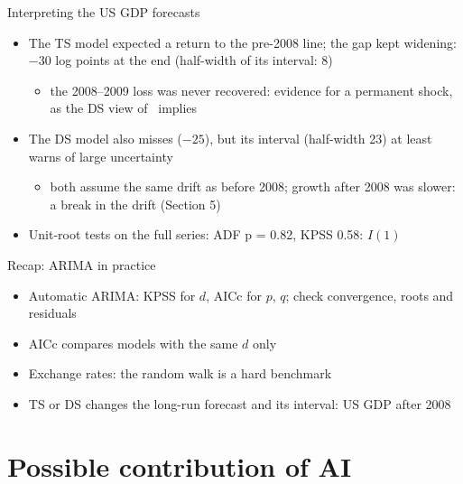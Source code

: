 \begin{frame}{Interpreting the US GDP forecasts}
\itemsize{\small}
\begin{itemize}
    \item The TS model expected a return to the pre-2008 line; the gap kept widening: $\ensuremath{-}30$ log points at the end (half-width of its interval: 8)
    \begin{itemize}
        \item the 2008--2009 loss was never recovered: evidence for a permanent shock, as the DS view of \ implies
    \end{itemize}
    \item The DS model also misses ($\ensuremath{-}25$), but its interval (half-width 23) at least warns of large uncertainty
    \begin{itemize}
        \item both assume the same drift as before 2008; growth after 2008 was slower: a break in the drift (Section 5)
    \end{itemize}
    \item Unit-root tests on the full series: ADF p = 0.82, KPSS 0.58: $I(1)$
\end{itemize}
\end{frame}

\begin{frame}{Recap: ARIMA in practice}
\itemsize{\small}
\begin{itemize}
    \item Automatic ARIMA: KPSS for $d$, AICc for $p$, $q$; check convergence, roots and residuals
    \item AICc compares models with the same $d$ only
    \item Exchange rates: the random walk is a hard benchmark 
    \item TS or DS changes the long-run forecast and its interval: US GDP after 2008
\end{itemize}
\end{frame}


\section{Possible contribution of AI}

